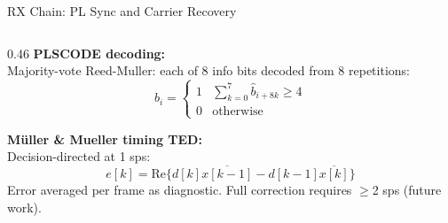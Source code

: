 \documentclass[aspectratio=169,10pt]{beamer}
\begin{document}
\begin{frame}[shrink=25]{RX Chain: PL Sync and Carrier Recovery}
\begin{columns}[T]
\begin{column}{0.46\textwidth}
      \vspace{0.3em}
      \textbf{PLSCODE decoding:}\\
      \scriptsize Majority-vote Reed-Muller: each of 8 info bits decoded from 8 repetitions:
      \[b_i = \begin{cases}1 & \sum_{k=0}^{7}\hat{b}_{i+8k}\geq 4\\ 0 & \text{otherwise}\end{cases}\]

      \vspace{0.3em}
      \textbf{M\"uller \& Mueller timing TED:}\\
      \scriptsize Decision-directed at 1 sps:
      \[e[k] = \mathrm{Re}\{d[k]\overline{x[k-1]} - d[k-1]\overline{x[k]}\}\]
      Error averaged per frame as diagnostic. Full correction requires $\geq$2 sps (future work).

    \end{column}
  \end{columns}
\end{frame}
\end{document}
